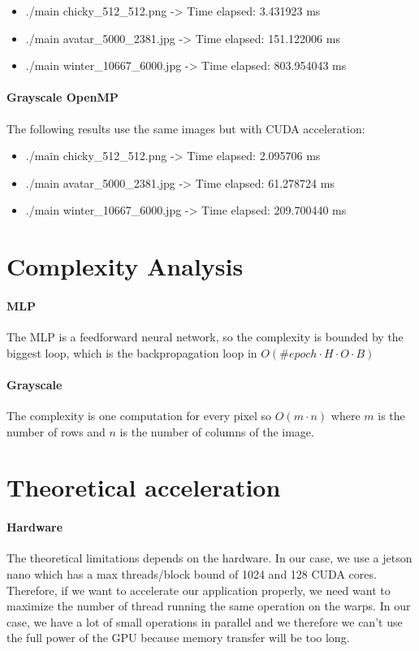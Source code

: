 \documentclass[11pt]{article}
\begin{document}
\begin{itemize}
	\item ./main chicky\_512\_512.png -> Time elapsed: 3.431923 ms
	\item ./main avatar\_5000\_2381.jpg -> Time elapsed: 151.122006 ms
	\item ./main winter\_10667\_6000.jpg -> Time elapsed: 803.954043 ms
\end{itemize}

\paragraph*{Grayscale OpenMP} The following results use the same images but with CUDA acceleration:

\begin{itemize}
	\item	./main chicky\_512\_512.png -> Time elapsed: 2.095706 ms
	\item	./main avatar\_5000\_2381.jpg -> Time elapsed: 61.278724 ms
	\item	./main winter\_10667\_6000.jpg -> Time elapsed: 209.700440 ms
\end{itemize}

\section{Complexity Analysis}

\paragraph*{MLP} The MLP is a feedforward neural network, so the complexity is bounded by the biggest loop, which is the backpropagation loop in $O(\#epoch  \cdot H \cdot O \cdot B)$

\paragraph*{Grayscale} The complexity is one computation for every pixel so $O(m \cdot n )$ where $m$ is the number of rows and $n$ is the number of columns of the image.

\section{Theoretical acceleration}

\paragraph*{Hardware} The theoretical limitations depends on the hardware.
In our case, we use a jetson nano which has a max threads/block bound of 1024 and 128 CUDA cores.
Therefore, if we want to accelerate our application properly, we need want to maximize the number of thread running the same operation on the warps.
In our case, we have a lot of small operations in parallel and we therefore we can't use the full power of the GPU because memory transfer will be too long.
\end{document}
